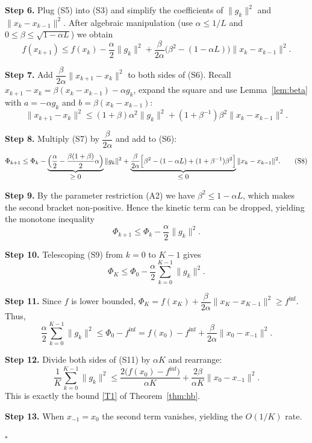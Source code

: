 \documentclass{article}
\begin{document}
\noindent\textbf{Step 6.} Plug (S5) into (S3) and simplify the coefficients of $\|g_{k}\|^{2}$ and $\|x_{k}-x_{k-1}\|^{2}$.
After algebraic manipulation (use $\alpha\le 1/L$ and $0\le\beta\le\sqrt{1-\alpha L}$) we obtain
\[
f(x_{k+1})\le f(x_{k})-\frac{\alpha}{2}\|g_{k}\|^{2}
+\frac{\beta}{2\alpha}\bigl(\beta^{2}- (1-\alpha L)\bigr)\|x_{k}-x_{k-1}\|^{2}.
\tag{S6}
\]

\noindent\textbf{Step 7.} Add $\dfrac{\beta}{2\alpha}\|x_{k+1}-x_{k}\|^{2}$ to both sides of (S6). Recall $x_{k+1}-x_{k}= \beta (x_{k}-x_{k-1})-\alpha g_{k}$, expand the square and use Lemma~\ref{lem:beta} with $a=-\alpha g_{k}$ and $b=\beta (x_{k}-x_{k-1})$:
\[
\|x_{k+1}-x_{k}\|^{2}\le (1+\beta)\alpha^{2}\|g_{k}\|^{2}
+(1+\beta^{-1})\beta^{2}\|x_{k}-x_{k-1}\|^{2}.
\tag{S7}
\]

\noindent\textbf{Step 8.} Multiply (S7) by $\dfrac{\beta}{2\alpha}$ and add to (S6):
\[
\Phi_{k+1}\le \Phi_{k}-\underbrace{\Bigl(\frac{\alpha}{2}-\frac{\beta(1+\beta)}{2}\alpha\Bigr)}_{\displaystyle\ge 0}
\|g_{k}\|^{2}
+\underbrace{\frac{\beta}{2\alpha}\Bigl[\beta^{2}-(1-\alpha L)+(1+\beta^{-1})\beta^{2}\Bigr]}_{\displaystyle\le 0}
\|x_{k}-x_{k-1}\|^{2}.
\tag{S8}
\]

\noindent\textbf{Step 9.} By the parameter restriction (A2) we have $ \beta^{2}\le 1-\alpha L$, which makes the second bracket non‑positive. Hence the kinetic term can be dropped, yielding the monotone inequality
\[
\Phi_{k+1}\le \Phi_{k}-\frac{\alpha}{2}\|g_{k}\|^{2}.
\tag{S9}
\]

\noindent\textbf{Step 10.} Telescoping (S9) from $k=0$ to $K-1$ gives
\[
\Phi_{K}\le \Phi_{0}-\frac{\alpha}{2}\sum_{k=0}^{K-1}\|g_{k}\|^{2}.
\tag{S10}
\]

\noindent\textbf{Step 11.} Since $f$ is lower bounded,
$\Phi_{K}=f(x_{K})+\dfrac{\beta}{2\alpha}\|x_{K}-x_{K-1}\|^{2}\ge f^{\inf}$.
Thus,
\[
\frac{\alpha}{2}\sum_{k=0}^{K-1}\|g_{k}\|^{2}
\le \Phi_{0}-f^{\inf}
= f(x_{0})-f^{\inf}+\frac{\beta}{2\alpha}\|x_{0}-x_{-1}\|^{2}.
\tag{S11}
\]

\noindent\textbf{Step 12.} Divide both sides of (S11) by $\alpha K$ and rearrange:
\[
\frac{1}{K}\sum_{k=0}^{K-1}\|g_{k}\|^{2}
\le \frac{2\bigl(f(x_{0})-f^{\inf}\bigr)}{\alpha K}
+\frac{2\beta}{\alpha K}\|x_{0}-x_{-1}\|^{2}.
\tag{S12}
\]
This is exactly the bound \eqref{T1} of Theorem~\ref{thm:hb}.

\noindent\textbf{Step 13.} When $x_{-1}=x_{0}$ the second term vanishes, yielding the $O(1/K)$ rate.

\hfill $\square$
\end{document}
